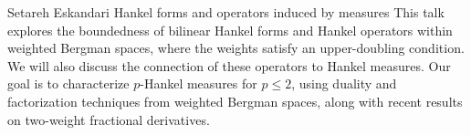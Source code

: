 \talk
{%
    Setareh Eskandari
}
{%
    Hankel forms and operators induced by measures
}
{%
    This talk explores the boundedness of bilinear Hankel forms and
    Hankel operators within weighted Bergman spaces, where the
    weights satisfy an upper-doubling condition. We will also
    discuss the connection of these operators to Hankel measures.
    Our goal is to characterize $p$-Hankel measures for $p \leq 2$,
    using duality and factorization techniques from weighted Bergman
    spaces, along with recent results on two-weight fractional
    derivatives.
}
